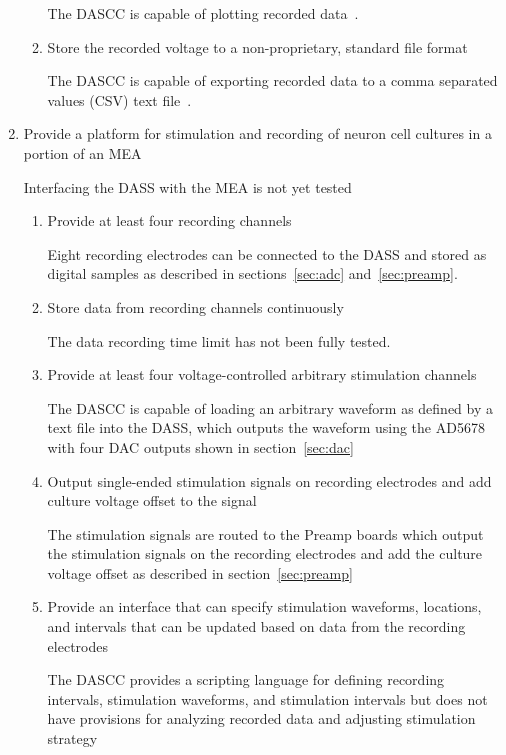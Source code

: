 \begin{enumerate}
\begin{enumerate}
	The DASCC is capable of plotting recorded data~\cite{BatzerMSEE}.
	
	\item Store the recorded voltage to a non-proprietary, standard file format
	
	The DASCC is capable of exporting recorded data to a comma separated values (CSV) text file~\cite{BatzerMSEE}.
	
	\end{enumerate}
	

\item Provide a platform for stimulation and recording of neuron cell cultures in a portion of an MEA

Interfacing the DASS with the MEA is not yet tested

	\begin{enumerate}
	
	\item Provide at least four recording channels
	
	Eight recording electrodes can be connected to the DASS and stored as digital samples as described in sections~\ref{sec:adc} and~\ref{sec:preamp}.
	
	\item Store data from recording channels continuously
	
	The data recording time limit has not been fully tested.
	
	\item Provide at least four voltage-controlled arbitrary stimulation channels
	
	The DASCC is capable of loading an arbitrary waveform as defined by a text file into the DASS, which outputs the waveform using the AD5678 with four DAC outputs shown in section~\ref{sec:dac}~\cite{BatzerMSEE}
	
	\item Output single-ended stimulation signals on recording electrodes and add culture voltage offset to the signal
	
	The stimulation signals are routed to the Preamp boards which output the stimulation signals on the recording electrodes and add the culture voltage offset as described in section~\ref{sec:preamp}
	
	\item Provide an interface that can specify stimulation waveforms, locations, and intervals that can be updated based on data from the recording electrodes
	
	The DASCC provides a scripting language for defining recording intervals, stimulation waveforms, and stimulation intervals but does not have provisions for analyzing recorded data and adjusting stimulation strategy~\cite{BatzerMSEE}
	

\end{enumerate}
\end{enumerate}
